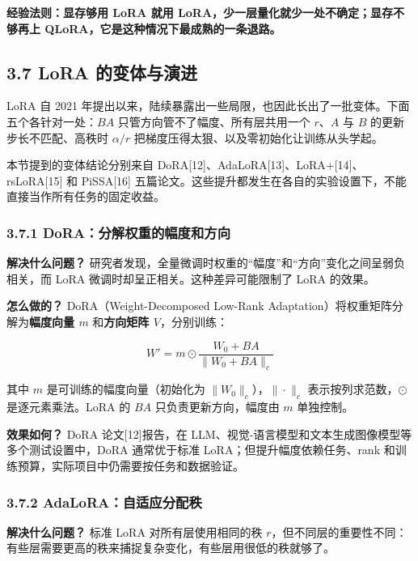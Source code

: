 \documentclass[
  chinese,
]{ctexart}
\begin{document}
\textbf{经验法则：显存够用 LoRA 就用
LoRA，少一层量化就少一处不确定；显存不够再上
QLoRA，它是这种情况下最成熟的一条退路。}

\subsection{3.7 LoRA
的变体与演进}\label{lora-ux7684ux53d8ux4f53ux4e0eux6f14ux8fdb}

LoRA 自 2021
年提出以来，陆续暴露出一些局限，也因此长出了一批变体。下面五个各针对一处：\(BA\)
只管方向管不了幅度、所有层共用一个 \(r\)、\(A\) 与 \(B\)
的更新步长不匹配、高秩时 \(\alpha/r\)
把梯度压得太狠、以及零初始化让训练从头学起。

本节提到的变体结论分别来自
DoRA{[}12{]}、AdaLoRA{[}13{]}、LoRA+{[}14{]}、rsLoRA{[}15{]} 和
PiSSA{[}16{]}
五篇论文。这些提升都发生在各自的实验设置下，不能直接当作所有任务的固定收益。

\subsubsection{3.7.1
DoRA：分解权重的幅度和方向}\label{doraux5206ux89e3ux6743ux91cdux7684ux5e45ux5ea6ux548cux65b9ux5411}

\textbf{解决什么问题？}
研究者发现，全量微调时权重的``幅度''和``方向''变化之间呈弱负相关，而
LoRA 微调时却呈正相关。这种差异可能限制了 LoRA 的效果。

\textbf{怎么做的？} DoRA（Weight-Decomposed Low-Rank
Adaptation）将权重矩阵分解为\textbf{幅度向量 \(m\)} 和\textbf{方向矩阵
\(V\)}，分别训练：

\[W' = m \odot \frac{W_0 + BA}{\|W_0 + BA\|_c}\]

其中 \(m\) 是可训练的幅度向量（初始化为 \(\|W_0\|_c\)），\(\|\cdot\|_c\)
表示按列求范数，\(\odot\) 是逐元素乘法。LoRA 的 \(BA\)
只负责更新方向，幅度由 \(m\) 单独控制。

\textbf{效果如何？} DoRA 论文{[}12{]}报告，在
LLM、视觉-语言模型和文本生成图像模型等多个测试设置中，DoRA 通常优于标准
LoRA；但提升幅度依赖任务、rank
和训练预算，实际项目中仍需要按任务和数据验证。

\subsubsection{3.7.2
AdaLoRA：自适应分配秩}\label{adaloraux81eaux9002ux5e94ux5206ux914dux79e9}

\textbf{解决什么问题？} 标准 LoRA 对所有层使用相同的秩
\(r\)，但不同层的重要性不同：有些层需要更高的秩来捕捉复杂变化，有些层用很低的秩就够了。
\end{document}
